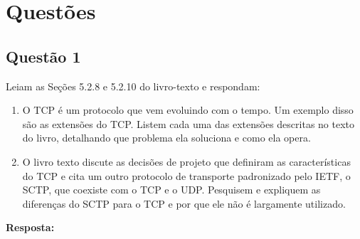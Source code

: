 \section{Questões}\label{sec:questoes}


\subsection{Questão 1}
Leiam as Seções 5.2.8 e 5.2.10 do livro-texto e respondam:
\begin{enumerate}[label=\alph*.]
    \item O TCP é um protocolo que vem evoluindo com o tempo. Um exemplo disso são as
extensões do TCP. Listem cada uma das extensões descritas no texto do livro,
detalhando que problema ela soluciona e como ela opera.
    \item O livro texto discute as decisões de projeto que definiram as características
do TCP e cita um outro protocolo de transporte padronizado pelo IETF, o SCTP,
que coexiste com o TCP e o UDP. Pesquisem e expliquem as diferenças do SCTP para
o TCP e por que ele não é largamente utilizado.\\
\end{enumerate}

\noindent
\textbf{Resposta:} \\

